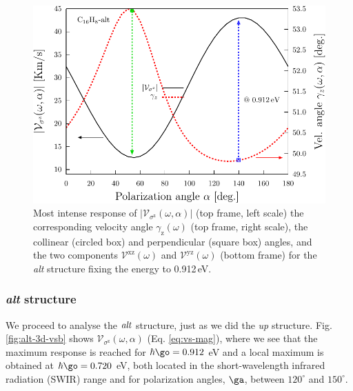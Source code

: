 \documentclass[prb,11pt,tightenlines,twocolumn,aps]{revtex4-1}
\begin{document}
\begin{figure}[t]
    \centering
    \includegraphics[width=\linewidth]{altplots/alt-vaz-rag}
    \caption{Most intense response of
    $|\mathcal{V}_{\sigma^{\mathrm{z}}}(\omega,\alpha)|$ (top frame, left
    scale) the corresponding velocity angle $\gamma_{\mathrm{z}}(\omega)$ (top
    frame, right scale), the collinear (circled box) and perpendicular (square
    box) angles, and the two components $\mathcal{V}^{\mathrm{xz}}(\omega)$ and
    $\mathcal{V}^{\mathrm{yz}}(\omega)$ (bottom frame) for the \emph{alt}
    structure fixing the energy to 0.912\,eV.}
    \label{fig:alt-vaz-rag}
\end{figure}


\subsubsection{{\it alt} structure}

We proceed to analyse the ${\it alt}$ structure, just as we did the
{\it up} structure. 
Fig. \ref{fig:alt-3d-vsb} shows
$\mathcal{V}_{\sigma^{\mathrm{z}}} (\omega,\alpha)$ (Eq. \eqref{eq:vs-mag}),
where we see that
% 
the maximum response is reached for $\hbar\go=0.912$ eV
and a local maximum is obtained at
$\hbar\go=0.720$ eV, both located in the
short-wavelength infrared radiation (SWIR)
 range and for polarization angles, $\ga$,  between $120^{\circ}$ and $150^{\circ}$.
\end{document}
